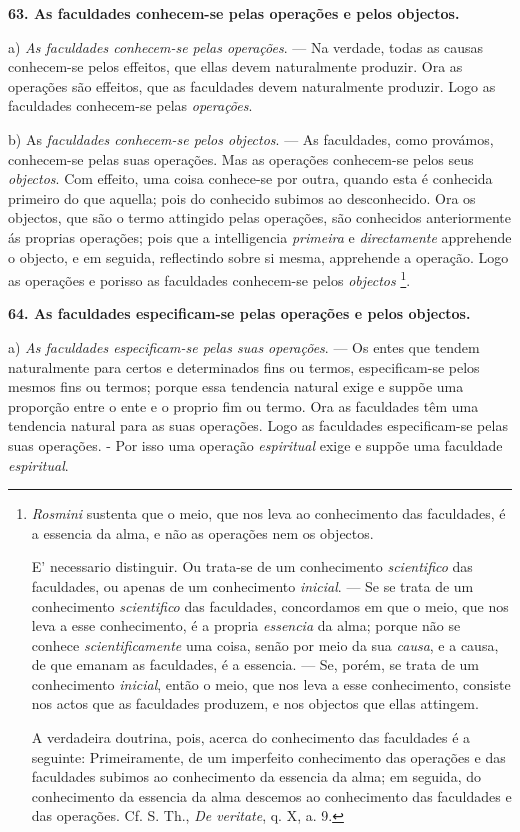 \textbf{63. As faculdades conhecem-se pelas operações e pelos objectos.}

a) \emph{As faculdades conhecem-se pelas operações}. --- Na verdade, todas as causas conhecem-se pelos effeitos, que ellas devem naturalmente produzir. Ora as operações são effeitos, que as faculdades devem naturalmente produzir. Logo as faculdades conhecem-se pelas \emph{operações}.

b) As \emph{faculdades conhecem-se pelos objectos}. --- As faculdades, como provámos, conhecem-se pelas suas operações. Mas as operações conhecem-se pelos seus \emph{objectos}. Com effeito, uma coisa conhece-se por outra, quando esta é conhecida primeiro do que aquella; pois do conhecido subimos ao desconhecido. Ora os objectos, que são o termo attingido pelas operações, são conhecidos anteriormente ás proprias operações; pois que a intelligencia \emph{primeira} e \emph{directamente} apprehende o objecto, e em seguida, reflectindo sobre si mesma, apprehende a operação. Logo as operações e porisso as faculdades conhecem-se pelos \emph{objectos} \footnote{\emph{Rosmini} sustenta que o meio, que nos leva ao conhecimento das faculdades, é a essencia da alma, e não as operações nem os objectos.\par E' necessario distinguir. Ou trata-se de um conhecimento \emph{scientifico} das faculdades, ou apenas de um conhecimento \emph{inicial}. --- Se se trata de um conhecimento \emph{scientifico} das faculdades, concordamos em que o meio, que nos leva a esse conhecimento, é a propria \emph{essencia} da alma; porque não se conhece \emph{scientificamente} uma coisa, senão por meio da sua \emph{causa}, e a causa, de que emanam as faculdades, é a essencia. --- Se, porém, se trata de um conhecimento \emph{inicial}, então o meio, que nos leva a esse conhecimento, consiste nos actos que as faculdades produzem, e nos objectos que ellas attingem.\par A verdadeira doutrina, pois, acerca do conhecimento das faculdades é a seguinte: Primeiramente, de um imperfeito conhecimento das operações e das faculdades subimos ao conhecimento da essencia da alma; em seguida, do conhecimento da essencia da alma descemos ao conhecimento das faculdades e das operações. Cf. S. Th., \emph{De veritate}, q. X, a. 9.}.

\textbf{64. As faculdades especificam-se pelas operações e pelos objectos.}

a) \emph{As faculdades especificam-se pelas suas operações}. --- Os entes que tendem naturalmente para certos e determinados fins ou termos, especificam-se pelos mesmos fins ou termos; porque essa tendencia natural exige e suppõe uma proporção   entre o ente e o proprio fim ou termo. Ora as faculdades têm uma tendencia natural para as suas operações. Logo as faculdades especificam-se pelas suas operações. - Por isso uma operação \emph{espiritual} exige e suppõe uma faculdade \emph{espiritual}.

